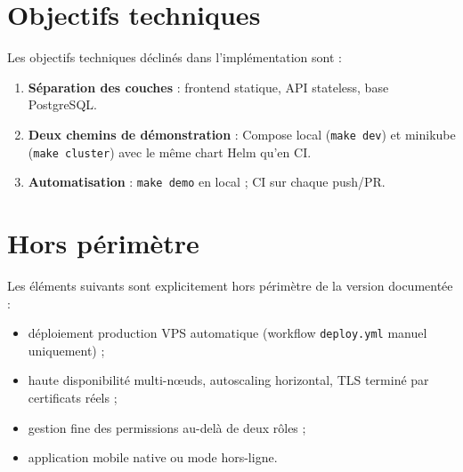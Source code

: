 \section{Objectifs techniques}

Les objectifs techniques déclinés dans l'implémentation sont :

\begin{enumerate}
  \item \textbf{Séparation des couches} : frontend statique, API stateless, base PostgreSQL.
  \item \textbf{Deux chemins de démonstration} : Compose local (\texttt{make dev}) et minikube (\texttt{make cluster}) avec le même chart Helm qu'en CI.
  \item \textbf{Automatisation} : \texttt{make demo} en local ; CI sur chaque push/PR.
\end{enumerate}

\section{Hors périmètre}

Les éléments suivants sont explicitement hors périmètre de la version documentée :
\begin{itemize}
  \item déploiement production VPS automatique (workflow \texttt{deploy.yml} manuel uniquement) ;
  \item haute disponibilité multi-nœuds, autoscaling horizontal, TLS terminé par certificats réels ;
  \item gestion fine des permissions au-delà de deux rôles ;
  \item application mobile native ou mode hors-ligne.
\end{itemize}
